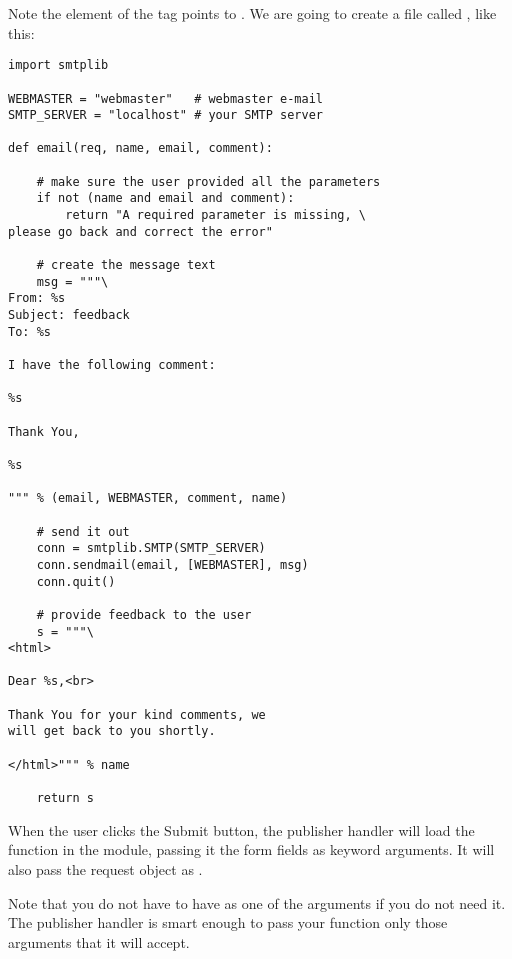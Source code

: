 Note the  element of the  tag points to
. We are going to create a file called ,
like this:

\begin{verbatim}
import smtplib

WEBMASTER = "webmaster"   # webmaster e-mail
SMTP_SERVER = "localhost" # your SMTP server

def email(req, name, email, comment):

    # make sure the user provided all the parameters
    if not (name and email and comment):
        return "A required parameter is missing, \
please go back and correct the error"

    # create the message text
    msg = """\
From: %s                                                                                                                                           
Subject: feedback
To: %s

I have the following comment:

%s

Thank You,

%s                                                                                                                                                 

""" % (email, WEBMASTER, comment, name)

    # send it out
    conn = smtplib.SMTP(SMTP_SERVER)
    conn.sendmail(email, [WEBMASTER], msg)
    conn.quit()

    # provide feedback to the user
    s = """\
<html>

Dear %s,<br>                                                                                                                                       

Thank You for your kind comments, we
will get back to you shortly.

</html>""" % name

    return s
\end{verbatim}

When the user clicks the Submit button, the publisher handler will
load the  function in the  module,
passing it the form fields as keyword arguments. It will also pass the
request object as .

Note that you do not have to have \code{req} as one of the arguments
if you do not need it. The publisher handler is smart enough to pass
your function only those arguments that it will accept.


